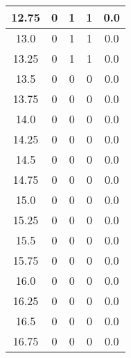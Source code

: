 \documentclass[letterpaper, 12pt]{article}
\begin{document}
\begin{longtable}{|c|c|c|c|c|}
\hline
12.75 & 0 & 1 & 1 & 0.0 \\
\hline
13.0 & 0 & 1 & 1 & 0.0 \\
\hline
13.25 & 0 & 1 & 1 & 0.0 \\
\hline
13.5 & 0 & 0 & 0 & 0.0 \\
\hline
13.75 & 0 & 0 & 0 & 0.0 \\
\hline
14.0 & 0 & 0 & 0 & 0.0 \\
\hline
14.25 & 0 & 0 & 0 & 0.0 \\
\hline
14.5 & 0 & 0 & 0 & 0.0 \\
\hline
14.75 & 0 & 0 & 0 & 0.0 \\
\hline
15.0 & 0 & 0 & 0 & 0.0 \\
\hline
15.25 & 0 & 0 & 0 & 0.0 \\
\hline
15.5 & 0 & 0 & 0 & 0.0 \\
\hline
15.75 & 0 & 0 & 0 & 0.0 \\
\hline
16.0 & 0 & 0 & 0 & 0.0 \\
\hline
16.25 & 0 & 0 & 0 & 0.0 \\
\hline
16.5 & 0 & 0 & 0 & 0.0 \\
\hline
16.75 & 0 & 0 & 0 & 0.0 \\
\hline
\end{longtable}
\end{document}

